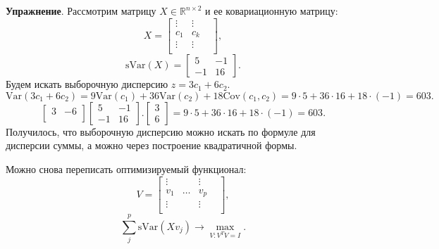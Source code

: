 \documentclass[12pt]{article} %
\theoremstyle{definition} %
\begin{document}
\textbf{Упражнение}. Рассмотрим матрицу $X \in \mathbb{R}^{n \times 2}$ и ее ковариационную матрицу:
$$
X = \begin{bmatrix}
    \vdots & \vdots & \\
    c_1 &  c_k \\
    \vdots &   \vdots & \\
    \end{bmatrix},
$$
$$
\text{sVar}(X) =
\begin{bmatrix}
5 & -1 \\
-1 & 16
\end{bmatrix}.
$$
Будем искать выборочную дисперсию $z = 3c_1 + 6c_2$.
$$\text{Var}(3c_1+6c_2)=9\text{Var}(c_1) + 36 \text{Var}(c_2) + 18 \text{Cov}(c_1, c_2) = 9 \cdot 5 + 36 \cdot 16 + 18 \cdot (-1) = 603.$$
$$
\begin{bmatrix}
3 & -6 \\
\end{bmatrix}
\begin{bmatrix}
5 & -1 \\
-1 & 16
\end{bmatrix}.
\begin{bmatrix}
3\\
6
\end{bmatrix}=9 \cdot 5 + 36 \cdot 16 + 18 \cdot (-1) = 603.
$$
Получилось, что выборочную дисперсию можно искать по формуле для дисперсии суммы, а можно через построение квадратичной формы.

Можно снова переписать оптимизируемый функционал:
$$
V = \begin{bmatrix}
    \vdots & & \vdots & \\
    v_1 & \dots &v_p \\
    \vdots & & \vdots & \\
    \end{bmatrix},
$$
$$\sum_{j}^p \text{sVar}(Xv_j) \to \max_{V: V^TV=I}.$$
\end{document}
